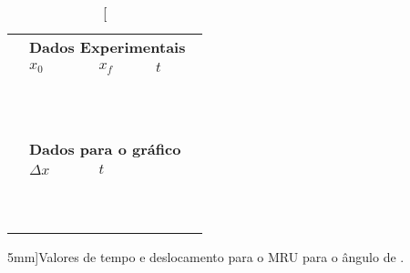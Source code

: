 \begin{table*}[!ht]
\centering
\begin{tabular}{lp{25mm}p{25mm}p{25mm}l}
\toprule
	&\multicolumn{4}{l}{\textbf{Dados Experimentais}} \\
	\cmidrule{2-4}
	& $x_0$ & $x_f$ & $t$ & \\
	\cmidrule{2-4}
	& \cellcolor[gray]{0.89} & \cellcolor[gray]{0.92} & \cellcolor[gray]{0.89} \\
	& \cellcolor[gray]{0.95} & \cellcolor[gray]{0.97} & \cellcolor[gray]{0.95} \\
	& \cellcolor[gray]{0.89} & \cellcolor[gray]{0.92} & \cellcolor[gray]{0.89} \\
	& \cellcolor[gray]{0.95} & \cellcolor[gray]{0.97} & \cellcolor[gray]{0.95} \\
	& \cellcolor[gray]{0.89} & \cellcolor[gray]{0.92} & \cellcolor[gray]{0.89} \\
	& \cellcolor[gray]{0.95} & \cellcolor[gray]{0.97} & \cellcolor[gray]{0.95} \\
	& \cellcolor[gray]{0.89} & \cellcolor[gray]{0.92} & \cellcolor[gray]{0.89} \\
	& \cellcolor[gray]{0.95} & \cellcolor[gray]{0.97} & \cellcolor[gray]{0.95} \\
	& \cellcolor[gray]{0.89} & \cellcolor[gray]{0.92} & \cellcolor[gray]{0.89} \\
	& \cellcolor[gray]{0.95} & \cellcolor[gray]{0.97} & \cellcolor[gray]{0.95} \\
	\cmidrule{2-4}
\\
	& \multicolumn{3}{l}{\textbf{Dados para o gráfico}} \\
	\cmidrule{2-3}
	& $\Delta x$ & $t$ \\
	\cmidrule{2-3}
	& \cellcolor[gray]{0.89} & \cellcolor[gray]{0.92} \\ 
	& \cellcolor[gray]{0.95} & \cellcolor[gray]{0.97} \\ 
	& \cellcolor[gray]{0.89} & \cellcolor[gray]{0.92} \\ 
	& \cellcolor[gray]{0.95} & \cellcolor[gray]{0.97} \\ 
	& \cellcolor[gray]{0.89} & \cellcolor[gray]{0.92} \\ 
	& \cellcolor[gray]{0.95} & \cellcolor[gray]{0.97} \\ 
	& \cellcolor[gray]{0.89} & \cellcolor[gray]{0.92} \\ 
	& \cellcolor[gray]{0.95} & \cellcolor[gray]{0.97} \\ 
	& \cellcolor[gray]{0.89} & \cellcolor[gray]{0.92} \\ 
	& \cellcolor[gray]{0.95} & \cellcolor[gray]{0.97} \\ 
	\cmidrule{2-3}
\bottomrule
\end{tabular}
\caption[][5mm]{Valores de tempo e deslocamento para o MRU para o ângulo de .}
\label{DadosMRU2}
\end{table*}

